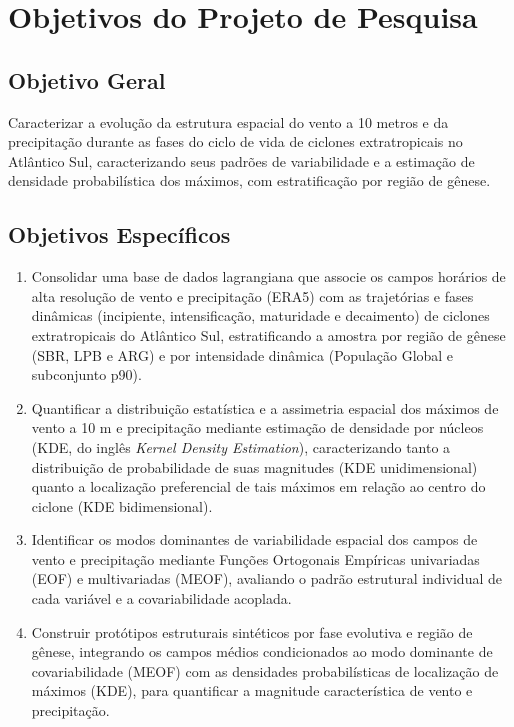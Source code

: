 \section{Objetivos do Projeto de Pesquisa}

\subsection{Objetivo Geral}
Caracterizar a evolução da estrutura espacial do vento a 10 metros e da precipitação durante as fases do ciclo de vida de ciclones extratropicais no Atlântico Sul, caracterizando seus padrões de variabilidade e a estimação de densidade probabilística dos máximos, com estratificação por região de gênese.

\subsection{Objetivos Específicos}
\begin{enumerate}
    \item Consolidar uma base de dados lagrangiana que associe os campos horários de alta resolução de vento e precipitação (ERA5) com as trajetórias e fases dinâmicas (incipiente, intensificação, maturidade e decaimento) de ciclones extratropicais do Atlântico Sul, estratificando a amostra por região de gênese (SBR, LPB e ARG) e por intensidade dinâmica (População Global e subconjunto p90).
    \item Quantificar a distribuição estatística e a assimetria espacial dos máximos de vento a 10 m e precipitação mediante estimação de densidade por núcleos (KDE, do inglês \textit{Kernel Density Estimation}), caracterizando tanto a distribuição de probabilidade de suas magnitudes (KDE unidimensional) quanto a localização preferencial de tais máximos em relação ao centro do ciclone (KDE bidimensional).
    \item Identificar os modos dominantes de variabilidade espacial dos campos de vento e precipitação mediante Funções Ortogonais Empíricas univariadas (EOF) e multivariadas (MEOF), avaliando o padrão estrutural individual de cada variável e a covariabilidade acoplada.
    \item Construir protótipos estruturais sintéticos por fase evolutiva e região de gênese, integrando os campos médios condicionados ao modo dominante de covariabilidade (MEOF) com as densidades probabilísticas de localização de máximos (KDE), para quantificar a magnitude característica de vento e precipitação.
\end{enumerate}